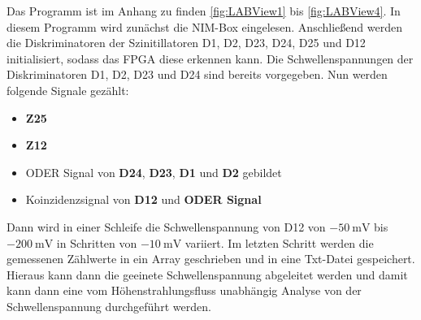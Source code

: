 \documentclass{article}
\begin{document}
Das Programm ist im Anhang zu finden \ref{fig:LABView1} bis \ref{fig:LABView4}.
In diesem Programm wird zunächst die NIM-Box eingelesen. Anschließend werden die Diskriminatoren der Szinitillatoren D1, D2, D23, D24, D25 und D12 initialisiert, sodass das FPGA diese erkennen kann.	
Die Schwellenspannungen der Diskriminatoren D1, D2, D23 und D24 sind bereits vorgegeben.
Nun werden folgende Signale gezählt:
\begin{itemize}
    \item \textbf{Z25}
    \item \textbf{Z12}
    \item ODER Signal von \textbf{D24}, \textbf{D23}, \textbf{D1} und \textbf{D2} gebildet	
    \item Koinzidenzsignal von \textbf{D12} und \textbf{ODER Signal}  	
\end{itemize}
Dann wird in einer Schleife die Schwellenspannung von D12 von $\SI{-50}{\milli\volt}$ bis $\SI{-200}{\milli\volt}$ in Schritten von $\SI{-10}{\milli\volt}$ variiert.
Im letzten Schritt werden die gemessenen Zählwerte in ein Array geschrieben und in eine Txt-Datei gespeichert.
Hieraus kann dann die geeinete Schwellenspannung abgeleitet werden und
damit kann dann eine vom Höhenstrahlungsfluss unabhängig Analyse von der Schwellenspannung durchgeführt werden.
\end{document}
